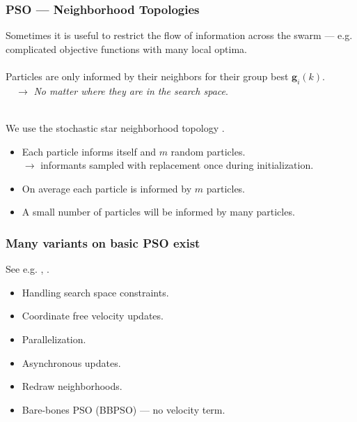 \documentclass[xcolor=dvipsnames]{beamer}
\begin{document}
\begin{frame}
\frametitle{PSO --- Neighborhood Topologies}
Sometimes it is useful to restrict the flow of information across the swarm --- e.g. complicated objective functions with many local optima.\\~\\

Particles are only informed by their {\color{blue}neighbors} for their group best $\bm{g}_i(k)$.\\
\ \ $\to$ \emph{No matter where they are in the search space}. \\~\\

\pause

We use the stochastic star neighborhood topology \citep{miranda2008stochastic}.\\
\begin{itemize}
\item Each particle informs itself and $m$ random particles.\\
$\to$ informants sampled with replacement once during initialization.
\item On average each particle is informed by $m$ particles.
\item A small number of particles will be informed by many particles.
\end{itemize}


\end{frame}

\begin{frame}
\frametitle{Many variants on basic PSO exist}
See e.g. \citet{clerc2011spso}, \citet[][appendix]{simpson2017adaptively}.
\begin{itemize}
\item Handling search space constraints.
\item Coordinate free velocity updates.
\item Parallelization.
\item Asynchronous updates.
\item Redraw neighborhoods.
\item Bare-bones PSO (BBPSO) --- no velocity term.
\end{itemize}
\end{frame}
\end{document}
